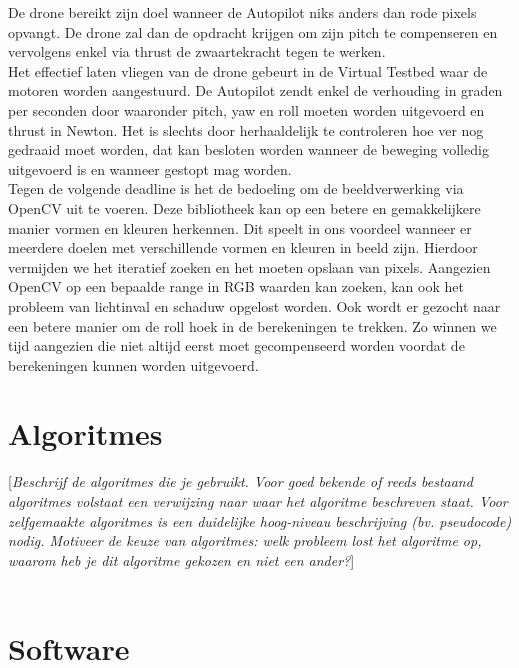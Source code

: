 \documentclass[tt]{penoverslag}
\begin{document}
De drone bereikt zijn doel wanneer de Autopilot niks anders dan rode pixels opvangt. De drone zal dan de opdracht krijgen om zijn pitch te compenseren en vervolgens enkel via thrust de zwaartekracht tegen te werken. \\

Het effectief laten vliegen van de drone gebeurt in de Virtual Testbed waar de motoren worden aangestuurd. De Autopilot zendt enkel de verhouding in graden per seconden door waaronder pitch, yaw en roll moeten worden uitgevoerd en thrust in Newton. Het is slechts door herhaaldelijk te controleren hoe ver nog gedraaid moet worden, dat kan besloten worden wanneer de beweging volledig uitgevoerd is en wanneer gestopt mag worden.\\

Tegen de volgende deadline is het de bedoeling om de beeldverwerking via OpenCV uit te voeren. Deze bibliotheek kan op een betere en gemakkelijkere manier vormen en kleuren herkennen. Dit speelt in ons voordeel wanneer er meerdere doelen met verschillende vormen en kleuren in beeld zijn. Hierdoor vermijden we het iteratief zoeken en het moeten opslaan van pixels. Aangezien OpenCV op een bepaalde range in RGB waarden kan zoeken, kan ook het probleem van lichtinval en schaduw opgelost worden.
Ook wordt er gezocht naar een betere manier om de roll hoek in de berekeningen te trekken. Zo winnen we tijd aangezien die niet altijd eerst moet gecompenseerd worden voordat de berekeningen kunnen worden uitgevoerd.  




\section{Algoritmes}

[{\em Beschrijf de algoritmes die je gebruikt.  Voor goed bekende of reeds bestaand algoritmes volstaat een verwijzing naar waar het algoritme beschreven staat.  Voor zelfgemaakte algoritmes is een duidelijke hoog-niveau beschrijving (bv. pseudocode) nodig.  Motiveer de keuze van algoritmes: welk probleem lost het algoritme op, waarom heb je dit algoritme gekozen en niet een ander?}]\\

\\



\section{Software}
\end{document}
